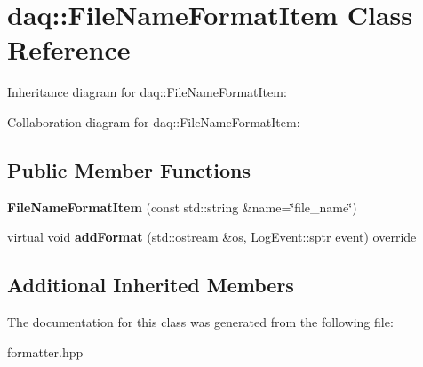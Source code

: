 \hypertarget{classdaq_1_1FileNameFormatItem}{}\section{daq\+:\+:File\+Name\+Format\+Item Class Reference}
\label{classdaq_1_1FileNameFormatItem}


Inheritance diagram for daq\+:\+:File\+Name\+Format\+Item\+:


Collaboration diagram for daq\+:\+:File\+Name\+Format\+Item\+:
\subsection*{Public Member Functions}
\begin{DoxyCompactItemize}
\item 
\mbox{\label{classdaq_1_1FileNameFormatItem_ac0058cd292ab54c37ba595e008981642}} 
{\bfseries File\+Name\+Format\+Item} (const std\+::string \&name=\char`\"{}file\+\_\+name\char`\"{})
\item 
\mbox{\label{classdaq_1_1FileNameFormatItem_a18a9821834ed2c1ac52b2bd34ae37ccf}} 
virtual void {\bfseries add\+Format} (std\+::ostream \&os, Log\+Event\+::sptr event) override
\end{DoxyCompactItemize}
\subsection*{Additional Inherited Members}


The documentation for this class was generated from the following file\+:\begin{DoxyCompactItemize}
\item 
formatter.\+hpp\end{DoxyCompactItemize}
